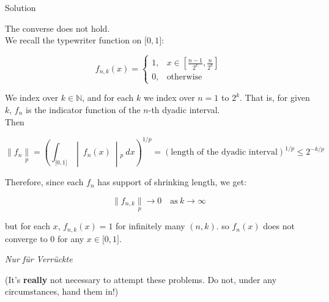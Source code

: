 \begin{qlsolution}{Solution}

The converse does not hold.\\
We recall the typewriter function on \(\lbrack 0,1\rbrack\):

\[f_{n,k}(x) = \left\{ \begin{matrix}
{1,} & {x \in \left\lbrack {\frac{n - 1}{2^{k}},\frac{n}{2^{k}}} \right\rbrack} \\
{0,} & \text{otherwise}
\end{matrix} \right.\]

We index over \(k \in \mathbb{N}\), and for each \(k\) we index over \(n = 1\) to \(2^{k}\). That is, for given \(k\), \(f_{n}\) is the indicator function of the \(n\)-th dyadic interval.\\
Then

\[\parallel f_{n}\underset{p}{\parallel} = \left( \int_{\lbrack 0,1\rbrack} \middle| \ f_{n}(x)\  \middle| {}_{p}\ dx \right)^{1/p} = \left( \text{length of the dyadic interval} \right)^{1/p} \leq 2^{- k/p}\]

Therefore, since each \(f_{n}\) has support of shrinking length, we get:

\[\parallel f_{n,k}\underset{p}{\parallel}\rightarrow 0\quad\text{as}\ k\rightarrow\infty\]

but for each \(x\), \(f_{n,k}(x) = 1\) for infinitely many \((n,k)\). so \(f_{n}(x)\) does not converge to 0 for any \(x \in \lbrack 0,1\rbrack\).

\end{qlsolution}

\emph{Nur für Verrückte}

(It's \textbf{really} not necessary to attempt these problems. Do not, under any circumstances, hand them in!)

